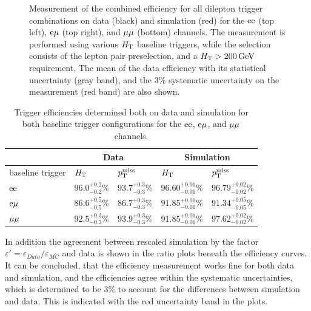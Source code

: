 \begin{figure}[htb]
 \caption{Measurement of the combined efficiency for all dilepton trigger combinations on data (black) and simulation (red) for the $\mathrm{e}\mathrm{e}$ (top left), $\mathrm{e}\mu$ (top right), and $\mu\mu$ (bottom) channels. The measurement is performed using various $H_{\mathrm{T}}$ baseline triggers, while the selection consists of the lepton pair preselection, and a $H_{\mathrm{T}}>200\,\text{Ge\hspace{-.08em}V}$ requirement. The mean of the data efficiency with its statistical uncertainty (gray band), and the $3\%$ systematic uncertainty on the measurement (red band) are also shown.}
 \label{fig:triggEff}
\end{figure}


\begin{table}[htb]
 \centering
 \caption{Trigger efficiencies determined both on data and simulation for both baseline trigger
  configurations for the $\mathrm{e}\mathrm{e}$, $\mathrm{e}{\mu}$, and ${\mu}{\mu}$ channels.}
 \label{tab:triggEff}
 \begin{tabular}{lllll}
                   & \multicolumn{2}{c}{Data} & \multicolumn{2}{c}{Simulation}                                                         \\\hline
  baseline trigger & $H_{\mathrm{T}}$                    & $p_{\mathrm{T}}^\text{miss}$                      & $H_{\mathrm{T}}$                     & $p_{\mathrm{T}}^\text{miss}$                 \\\hline
  $\mathrm{e}\mathrm{e}$         & $96.0^{+0.2}_{-0.2}\%$   & $93.7^{+0.3}_{-0.3}\%$         & $96.60^{+0.01}_{-0.01}\%$ & $96.79^{+0.02}_{-0.02}\%$ \\
  $\mathrm{e}{\mu}$        & $86.6^{+0.5}_{-0.5}\%$   & $86.7^{+0.3}_{-0.3}\%$         & $91.85^{+0.01}_{-0.01}\%$ & $91.34^{+0.05}_{-0.05}\%$ \\
  ${\mu}{\mu}$       & $92.5^{+0.3}_{-0.3}\%$   & $93.9^{+0.3}_{-0.3}\%$         & $91.85^{+0.01}_{-0.01}\%$ & $97.62^{+0.02}_{-0.02}\%$ \\\hline
 \end{tabular}
\end{table}


In addition the agreement between rescaled simulation by the factor $\varepsilon'=\varepsilon_{Data}/\varepsilon_{MC}$ and data is shown in the ratio plots beneath the efficiency curves. It can be concluded, that the efficiency measurement works fine for both data and simulation, and the efficiencies agree within the systematic uncertainties, which is determined to be $3\%$ to account for the differences between simulation and data. This is indicated with the red uncertainty band in the plots.\\

